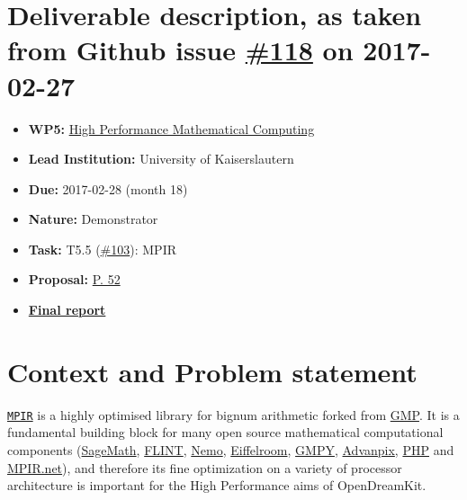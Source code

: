 \section*{\texorpdfstring{Deliverable description, as taken from Github
issue
\href{https://github.com/OpenDreamKit/OpenDreamKit/issues/118}{\#118} on
2017-02-27}{Deliverable description, as taken from Github issue \#118 on 2017-02-27}}\label{deliverable-description-as-taken-from-github-issue-118-on-2017-02-27}

\begin{itemize}
\tightlist
\item
  \textbf{WP5:}
  \href{https://github.com/OpenDreamKit/OpenDreamKit/tree/master/WP5}{High
  Performance Mathematical Computing}
\item
  \textbf{Lead Institution:} University of Kaiserslautern
\item
  \textbf{Due:} 2017-02-28 (month 18)
\item
  \textbf{Nature:} Demonstrator
\item
  \textbf{Task:} T5.5
  (\href{https://github.com/OpenDreamKit/OpenDreamKit/issues/103}{\#103}):
  MPIR
\item
  \textbf{Proposal:}
  \href{https://github.com/OpenDreamKit/OpenDreamKit/raw/master/Proposal/proposal-www.pdf}{P.
  52}
\item
  \textbf{\href{https://github.com/OpenDreamKit/OpenDreamKit/raw/master/WP5/D5.5/report-final.pdf}{Final
  report}}
\end{itemize}

\section*{Context and Problem
statement}\label{context-and-problem-statement}

\href{www.mpir.org}{\texttt{MPIR}} is a highly optimised library for
bignum arithmetic forked from \href{https://gmplib.org/}{GMP}. It is a
fundamental building block for many open source mathematical
computational components (\href{http://sagemath.org}{SageMath},
\href{http://flintlib.org/}{FLINT}, \href{http://nemocas.org/}{Nemo},
\href{https://room.eiffel.com/node/407}{Eiffelroom},
\href{https://pypi.python.org/pypi/gmpy2}{GMPY},
\href{http://www.advanpix.com/}{Advanpix}, \href{http://php.net/}{PHP}
and \href{http://wezeku.github.io/Mpir.NET/}{MPIR.net}), and therefore
its fine optimization on a variety of processor architecture is
important for the High Performance aims of OpenDreamKit.

